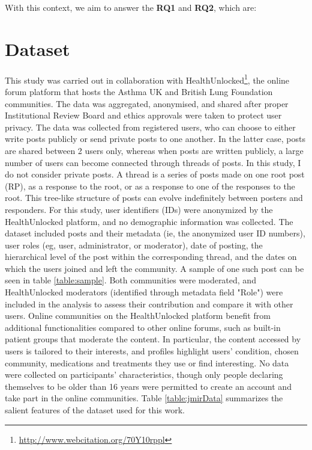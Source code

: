 With this context, we aim to answer the \textbf{RQ1} and \textbf{RQ2}, which are: 

\noindent{}

\section{Dataset}
\label{sec:dataset}
This study was carried out in collaboration with HealthUnlocked\footnote{\url{http://www.webcitation.org/70Y10rppl}}, the online forum platform that hosts the Asthma UK and British Lung Foundation communities. The data was aggregated, anonymised, and shared after proper Institutional Review Board and ethics approvals were taken to protect user privacy. The data was collected from  registered users, who can choose to either write posts publicly or send private posts to one another. In the latter case, posts are shared between 2 users only, whereas when posts are written publicly, a large number of users can become connected through threads of posts. In this study, I do not consider private posts. 
A thread is a series of posts made on one root post (RP), as a response to the root, or as a response to one of the responses to the root. This tree-like structure of posts can evolve indefinitely between posters and responders. 
For this study, user identifiers (IDs) were anonymized by the HealthUnlocked platform, and no demographic information was collected. 
The dataset included posts and their metadata (ie, the anonymized user ID numbers), user roles (eg, user, administrator, or moderator), date of posting, the hierarchical level of the post within the corresponding thread, and the dates on which the users joined and left the community. A sample of one such post can be seen in table \ref{table:sample}. Both communities were moderated, and HealthUnlocked moderators (identified through metadata field "Role") were included in the analysis to assess their contribution and compare it with other users. Online communities on the HealthUnlocked platform benefit from additional functionalities compared to other online forums, such as built-in patient groups that moderate the content. In particular, the content accessed by users is tailored to their interests, and profiles highlight users’ condition, chosen community, medications and treatments they use or find interesting. No data were collected on participants’ characteristics, though only people declaring themselves to be older than 16 years were permitted to create an account and take part in the online communities. Table \ref{table:jmirData} summarizes the salient features of the dataset used for this work. 



